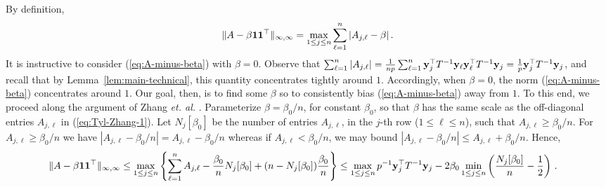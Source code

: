 \documentclass[times,sort&compress,3p]{elsarticle}
\begin{document}
By definition,
\begin{equation}\label{eq:A-minus-beta}
    \| A - \beta{\bf 1}{\bf 1}^\top\|_{\infty,\infty} = \max_{1\le j \le n} \sum_{\ell=1}^n | A_{j,\ell}-\beta| \,.
\end{equation}
It is instructive to consider (\ref{eq:A-minus-beta}) with $\beta=0$. Observe that $\sum_{\ell=1}^n | A_{j,\ell}| = \frac{1}{np}\sum_{\ell=1}^n {\bf y}_j^\top T^{-1}{\bf y}_\ell{\bf y}_\ell^\top T^{-1}{\bf y}_j = \frac{1}{p}{\bf y}_j^\top T^{-1}{\bf y}_j$, and recall that by Lemma~\ref{lem:main-technical}, this quantity concentrates tightly around $1$.
Accordingly, when $\beta=0$, the norm (\ref{eq:A-minus-beta}) concentrates around $1$. Our goal, then, is to find some $\beta$ so to consistently bias (\ref{eq:A-minus-beta}) away from $1$. To this end, we proceed along 
the argument of Zhang {\it et. al.} \cite[Lemma 3.3]{zhang2016marvcenko}. 
Parameterize $\beta=\beta_0/n$, for constant $\beta_0$, so that $\beta$ has the same scale as the off-diagonal entries $A_{j,\ell}$ in (\ref{eq:Tyl-Zhang-1}). 
Let $N_j[\beta_0]$ be the number of entries $A_{j,\ell}$, in the $j$-th row ($1\le \ell \le n$), such that $A_{j,\ell}\ge \beta_0/n$. 
For $ A_{j,\ell}\ge \beta_0/n$  we have
$|  A_{j,\ell}-\beta_0/n| =  A_{j,\ell}-\beta_0/n $ whereas if 
$ A_{j,\ell}< \beta_0/n$, we may bound
$|  A_{j,\ell}-\beta_0/n|\le  A_{j,\ell}+\beta_0/n$.
Hence, 
\begin{equation}\label{eq:Tyl-Zhang-2}
\begin{split}
    \| A - \beta{\bf 1}{\bf 1}^\top\|_{\infty,\infty} 
    &\le  \max_{1\le j \le n} \left\{ \sum_{\ell=1}^n  A_{j,\ell} - \frac{\beta_0}{n} N_j[\beta_0] + (n-N_j[\beta_0])\frac{\beta_0}{n} \right\} 
    \le \max_{1\le j \le n}p^{-1}{\bf y}_j^\top T^{-1}{\bf y}_j -  2{\beta_0} \min_{1\le j \le n}\left( \frac{N_j[\beta_0]}{n}-\frac{1}{2} \right) \,.
\end{split}
\end{equation}
\end{document}
